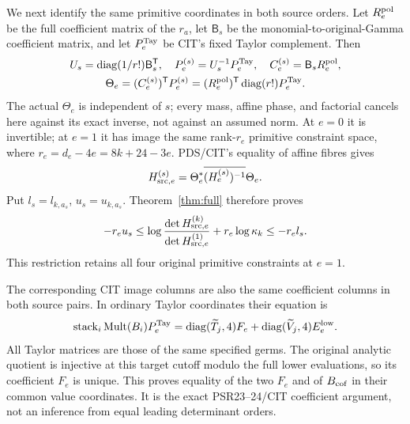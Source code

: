 \documentclass[11pt,a4paper]{article}
\begin{document}
We next identify the same primitive coordinates in both source orders. Let $R_e^{\rm pol}$ be the full coefficient matrix of the $r_a$, let $\mathsf B_s$ be the monomial-to-original-Gamma coefficient matrix, and let $P_e^{\rm Tay}$ be CIT's fixed Taylor complement. Then
\begin{equation}
\begin{gathered}
 U_s=\operatorname{diag}(1/r!)\mathsf B_s^{\mathsf T},\quad
 P_e^{(s)}=U_s^{-1}P_e^{\rm Tay},\quad C_e^{(s)}=\mathsf B_sR_e^{\rm pol},\\
 \Theta_e=(C_e^{(s)})^{\mathsf T}P_e^{(s)}
 =(R_e^{\rm pol})^{\mathsf T}\operatorname{diag}(r!)P_e^{\rm Tay}.
\end{gathered}\label{eq:Theta}
\end{equation}
The actual $\Theta_e$ is independent of $s$; every mass, affine phase, and factorial cancels here against its exact inverse, not against an assumed norm. At $e=0$ it is invertible; at $e=1$ it has image the same rank-$r_e$ primitive constraint space, where $r_e=d_e-4e=8k+24-3e$. PDS/CIT's equality of affine fibres gives
\[
 H_{{\rm src},e}^{(s)}=\Theta_e^*\overline{(H_e^{(s)})^{-1}}\Theta_e.
\]
Put $l_s=l_{k,a_s}$, $u_s=u_{k,a_s}$. Theorem~\ref{thm:full} therefore proves
\begin{equation}
 -r_eu_s\le
 \log\frac{\det H_{{\rm src},e}^{(k)}}{\det H_{{\rm src},e}^{(1)}}
       +r_e\log\kappa_k
 \le-r_el_s.
 \label{eq:sourceorder}
\end{equation}
This restriction retains all four original primitive constraints at $e=1$.

The corresponding CIT image columns are also the same coefficient columns in both source pairs. In ordinary Taylor coordinates their equation is
\[
 \operatorname{stack}_i\operatorname{Mult}(B_i)P_e^{\rm Tay}
 =\operatorname{diag}(\widetilde T_j,4)F_e
   +\operatorname{diag}(\widetilde V_j,4)E_e^{\rm low}.
\]
All Taylor matrices are those of the same specified germs. The original analytic quotient is injective at this target cutoff modulo the full lower evaluations, so its coefficient $F_e$ is unique. This proves equality of the two $F_e$ and of $B_{\rm cof}$ in their common value coordinates. It is the exact PSR23--24/CIT coefficient argument, not an inference from equal leading determinant orders.
\end{document}
